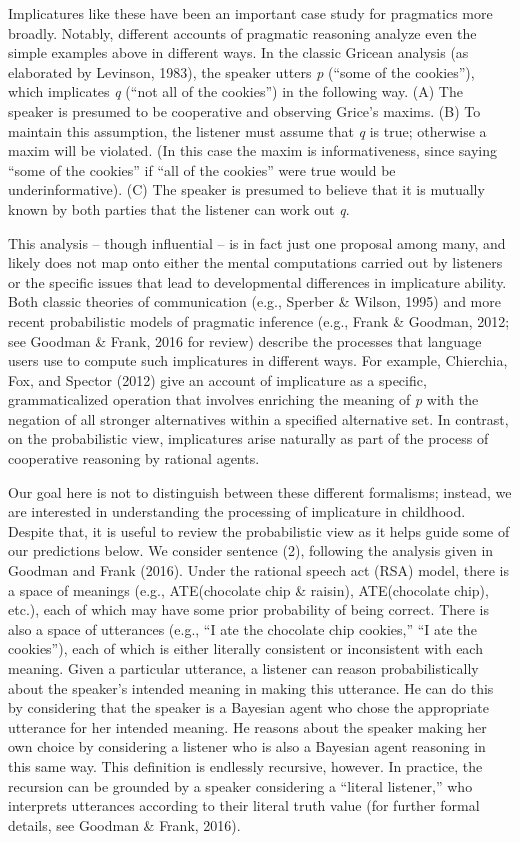 \documentclass[mask,man]{apa6}
\begin{document}
Implicatures like these have been an important case study for pragmatics
more broadly. Notably, different accounts of pragmatic reasoning analyze
even the simple examples above in different ways. In the classic Gricean
analysis (as elaborated by Levinson, 1983), the speaker utters \emph{p}
(\enquote{some of the cookies}), which implicates \emph{q} (\enquote{not
all of the cookies}) in the following way. (A) The speaker is presumed
to be cooperative and observing Grice's maxims. (B) To maintain this
assumption, the listener must assume that \emph{q} is true; otherwise a
maxim will be violated. (In this case the maxim is informativeness,
since saying \enquote{some of the cookies} if \enquote{all of the
cookies} were true would be underinformative). (C) The speaker is
presumed to believe that it is mutually known by both parties that the
listener can work out \emph{q}.

This analysis -- though influential -- is in fact just one proposal
among many, and likely does not map onto either the mental computations
carried out by listeners or the specific issues that lead to
developmental differences in implicature ability. Both classic theories
of communication (e.g., Sperber \& Wilson, 1995) and more recent
probabilistic models of pragmatic inference (e.g., Frank \& Goodman,
2012; see Goodman \& Frank, 2016 for review) describe the processes that
language users use to compute such implicatures in different ways. For
example, Chierchia, Fox, and Spector (2012) give an account of
implicature as a specific, grammaticalized operation that involves
enriching the meaning of \emph{p} with the negation of all stronger
alternatives within a specified alternative set. In contrast, on the
probabilistic view, implicatures arise naturally as part of the process
of cooperative reasoning by rational agents.

Our goal here is not to distinguish between these different formalisms;
instead, we are interested in understanding the processing of
implicature in childhood. Despite that, it is useful to review the
probabilistic view as it helps guide some of our predictions below. We
consider sentence (2), following the analysis given in Goodman and Frank
(2016). Under the rational speech act (RSA) model, there is a space of
meanings (e.g., ATE(chocolate chip \& raisin), ATE(chocolate chip),
etc.), each of which may have some prior probability of being correct.
There is also a space of utterances (e.g., \enquote{I ate the chocolate
chip cookies,} \enquote{I ate the cookies}), each of which is either
literally consistent or inconsistent with each meaning. Given a
particular utterance, a listener can reason probabilistically about the
speaker's intended meaning in making this utterance. He can do this by
considering that the speaker is a Bayesian agent who chose the
appropriate utterance for her intended meaning. He reasons about the
speaker making her own choice by considering a listener who is also a
Bayesian agent reasoning in this same way. This definition is endlessly
recursive, however. In practice, the recursion can be grounded by a
speaker considering a \enquote{literal listener,} who interprets
utterances according to their literal truth value (for further formal
details, see Goodman \& Frank, 2016).
\end{document}
